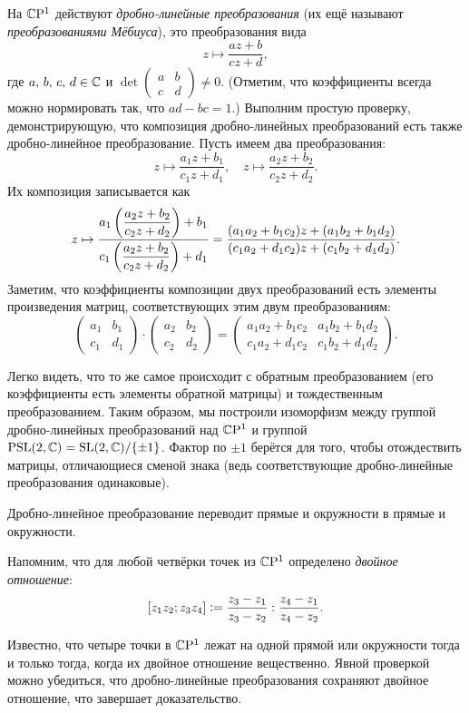 На $\mathbb{C}\mathrm{P}^1$ действуют \textit{дробно-линейные преобразования} (их ещё называют \textit{преобразованиями Мёбиуса}), это преобразования вида
\[
	z \mapsto \frac{az + b}{cz + d},
\]
где $a,\,b,\,c,\,d \in \mathbb{C}$ и
$\det\begin{pmatrix}
	a & b\\
	c & d
\end{pmatrix} \ne 0$. (Отметим, что коэффициенты всегда можно нормировать так, что $ad - bc = 1$.) Выполним простую проверку, демонстрирующую, что композиция дробно-линейных преобразований есть также дробно-линейное преобразование. Пусть имеем два преобразования:
\[
	z \mapsto \frac{a_1z + b_1}{c_1z + d_1},\quad
	z \mapsto \frac{a_2z + b_2}{c_2z + d_2}.
\]
Их композиция записывается как
\[
	z \mapsto \frac{a_1\left(\dfrac{a_2z + b_2}{c_2z + d_2}\right) + b_1}{c_1\left(\dfrac{a_2z + b_2}{c_2z + d_2}\right) + d_1} = \frac{(a_1a_2 + b_1c_2)z + (a_1b_2 + b_1d_2)}{(c_1a_2 + d_1c_2)z + (c_1b_2 + d_1d_2)}.
\]
Заметим, что коэффициенты композиции двух преобразований есть элементы произведения матриц, соответствующих этим двум преобразованиям:
\[
	\begin{pmatrix}
		a_1 & b_1\\
		c_1 & d_1
	\end{pmatrix} \cdot
	\begin{pmatrix}
		a_2 & b_2\\
		c_2 & d_2
	\end{pmatrix} =
	\begin{pmatrix}
		a_1a_2 + b_1c_2 & a_1b_2 + b_1d_2\\
		c_1a_2 + d_1c_2 & c_1b_2 + d_1d_2
	\end{pmatrix}.
\]

Легко видеть, что то же самое происходит с обратным преобразованием (его коэффициенты есть элементы обратной матрицы) и тождественным преобразованием. Таким образом, мы построили изоморфизм между группой дробно-линейных преобразований над $\mathbb{C}\mathrm{P}^1$ и группой $\mathrm{PSL}(2, \mathbb{C}) = \mathrm{SL}(2, \mathbb{C}) / \{\pm 1\}$. Фактор по $\pm 1$ берётся для того, чтобы отождествить матрицы, отличающиеся сменой знака (ведь соответствующие дробно-линейные преобразования одинаковые).

\begin{proposition}
	Дробно-линейное преобразование переводит прямые и окружности в прямые и окружности.
\end{proposition}

\begin{firstproof}
	Напомним, что для любой четвёрки точек из $\mathbb{C}\mathrm{P}^1$ определено \textit{двойное отношение}:
	\[
		[z_1z_2 ; z_3z_4] \vcentcolon = \frac{z_3 - z_1}{z_3 - z_2} : \frac{z_4 - z_1}{z_4 - z_2}.
	\]

	Известно, что четыре точки в $\mathbb{C}\mathrm{P}^1$ лежат на одной прямой или окружности тогда и только тогда, когда их двойное отношение вещественно. Явной проверкой можно убедиться, что дробно-линейные преобразования сохраняют двойное отношение, что завершает доказательство.
\end{firstproof}

